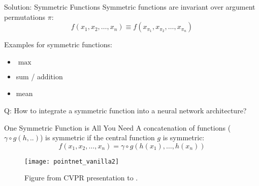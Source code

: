 \begin{frame}[c]{Solution: Symmetric Functions}
    \large
    Symmetric functions are invariant over argument permutations $\pi$:
    $$ f(x_1, x_2, \ldots, x_n) \equiv f(x_{\pi_{1}}, x_{\pi_{2}}, \ldots, x_{\pi_{n}}) $$

    \pause

    Examples for symmetric functions:

    \begin{itemize}
        \item $\max$
        \item sum / addition
        \item mean
    \end{itemize}
    \vspace{1em}

    Q: How to integrate a symmetric function into a neural network architecture?
\end{frame}


\begin{frame}[c]{One Symmetric Function is All You Need}
    \large
    A concatenation of functions ($\gamma \circ g(h,..)$) is symmetric if the central function $g$ is symmetric:
    $$ f(x_1, x_2, \ldots, x_n) = \gamma \circ g(h(x_1), \ldots, h(x_n)) $$
    \pause
    \centering
    \begin{figure}
        \texttt{[image: pointnet\_vanilla2]}
        \caption{Figure from CVPR presentation to \cite{qi2017pointnet}.}
    \end{figure}
\end{frame}


